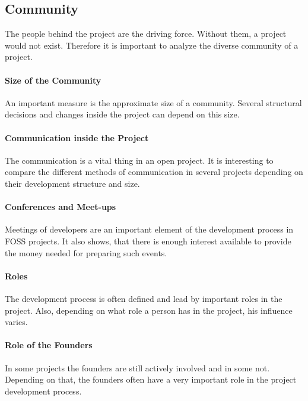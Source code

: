 \subsection{Community}

The people behind the project are the driving force. Without them, a project
would not exist. Therefore it is important to analyze the diverse community of
a project.

\paragraph{Size of the Community}

An important measure is the approximate size of a community. Several structural
decisions and changes inside the project can depend on this size.

\paragraph{Communication inside the Project}

The communication is a vital thing in an open project. It is interesting to
compare the different methods of communication in several projects depending on
their development structure and size.

\paragraph{Conferences and Meet-ups}

Meetings of developers are an important element of the development process in
\ac{FOSS} projects. It also shows, that there is enough interest available to
provide the money needed for preparing such events.

\paragraph{Roles}

The development process is often defined and lead by important roles in the
project. Also, depending on what role a person has in the project, his
influence varies.

\paragraph{Role of the Founders}

In some projects the founders are still actively involved and in some not.
Depending on that, the founders often have a very important role in the project
development process.

